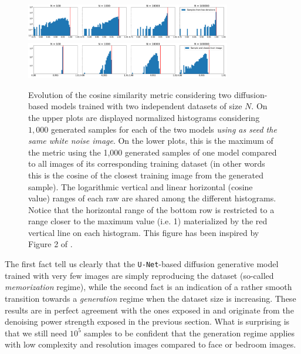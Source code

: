 \documentclass[11pt]{amsart}
\begin{document}
\begin{figure}
    \centering
	\includegraphics[width=0.8\textwidth]{fig-diffusion-cosine-AB.pdf}\\
	\includegraphics[width=0.8\textwidth]{fig-diffusion-cosine-ATrain.pdf}
	\caption{Evolution of the cosine similarity metric considering two diffusion-based models trained with two independent datasets of size $N$. On the upper plots are displayed normalized histograms considering $1,000$ generated samples for each of the two models \textit{using as seed the same white noise image}.  On the lower plots, this is the maximum of the metric  using the 1,000 generated samples of one model compared to all images of its corresponding training dataset (in other words this is the cosine of the closest training image from the generated sample). The logarithmic vertical and linear horizontal (cosine value) ranges of each raw are shared among the different histograms. Notice that the horizontal range of the bottom row is restricted to a range closer to the maximum value (i.e. 1) materialized by the red vertical line on each histogram. This figure has been inspired by Figure 2 of \cite{kadkhodaie2024generalization}.}
	\label{fig-cosine-diffusion}
\end{figure}
%
The first fact tell us clearly that the \texttt{U-Net}-based diffusion generative model trained with very few images are simply reproducing the dataset (so-called \textit{memorization} regime), while the second fact is an indication of a rather smooth transition towards a \textit{generation} regime when the dataset size is increasing. These results are in perfect agreement with the ones exposed in \cite{kadkhodaie2024generalization} and originate from the denoising power strength exposed in the previous section. What is surprising is that we still need $10^5$ samples to be confident that the generation regime applies with low complexity and resolution images compared to face or bedroom images.
\end{document}
